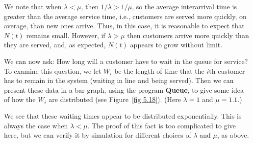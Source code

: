 \begin{example}
We note that when $\lambda < \mu$, then $1/\lambda > 1/\mu$, so the average interarrival time is
greater than the average service time, i.e., customers are served more quickly, on average, than
new ones arrive.  Thus, in this case, it is reasonable to expect that $N(t)$ remains small.
However, if $\lambda > \mu$ then customers arrive more quickly than they are served, and, as expected,
$N(t)$ appears to grow without limit.  
\par
We can now ask: How long will a customer have to wait in the queue for service?  To examine
this question, we let $W_i$ be the length of time that the
$i$th customer has to remain in the system (waiting in line and being served).  Then we can 
present these data in a bar graph, using the program {\bf Queue}, to give some idea of how the
$W_i$ are distributed (see Figure~\ref{fig 5.18}). (Here $\lambda = 1$ and $\mu = 1.1$.)
\par
We see that these waiting times appear to be distributed exponentially.  This is always
the case when $\lambda < \mu$.  The proof of this fact is too complicated to give here, but we
can verify it by simulation for different choices of $\lambda$ and $\mu$, as above.
\end{example}


